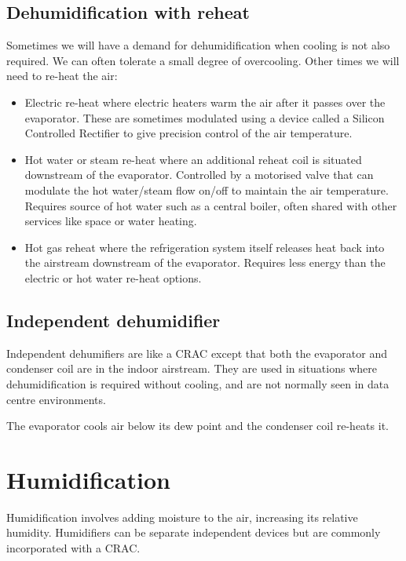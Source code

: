 \documentclass{pgnotes}
\begin{document}
\subsection{Dehumidification with reheat}
\label{sec:dehumidification-with-reheat}

Sometimes we will have a demand for dehumidification when cooling is not also required.
We can often tolerate a small degree of overcooling.
Other times we will need to re-heat the air:
\begin{itemize}
\item Electric re-heat where electric heaters warm the air after it passes over the evaporator.
  These are sometimes modulated using a device called a Silicon Controlled Rectifier to give precision control of the air temperature.
\item Hot water or steam re-heat where an additional reheat coil is situated downstream of the evaporator.
  Controlled by a motorised valve that can modulate the hot water/steam flow on/off to maintain the air temperature.
  Requires source of hot water such as a central boiler, often shared with other services like space or water heating. 
\item Hot gas reheat where the refrigeration system itself releases heat back into the airstream downstream of the evaporator.
  Requires less energy than the electric or hot water re-heat options.
\end{itemize}

\subsection{Independent dehumidifier}
\label{sec:independent-dehumidifier}

Independent dehumifiers are like a CRAC except that both the evaporator and condenser coil are in the indoor airstream.
They are used in situations where dehumidification is required without cooling, and are not normally seen in data centre environments. 

The evaporator cools air below its dew point and the condenser coil re-heats it. 

\section{Humidification}
\label{sec:humidification}

Humidification involves adding moisture to the air, increasing its relative humidity.
Humidifiers can be separate independent devices but are commonly incorporated with a CRAC.
\end{document}
